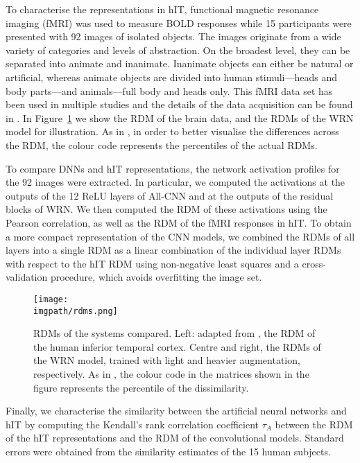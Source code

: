 {To characterise the representations in hIT, functional magnetic resonance imaging (fMRI) was used to measure BOLD responses while 15 participants were presented with 92 images of isolated objects. The images originate from a wide variety of categories and levels of abstraction. On the broadest level, they can be separated into animate and inanimate. Inanimate objects can either be natural or artificial, whereas animate objects are divided into human stimuli---heads and body parts---and animals---full body and heads only. This fMRI data set has been used in multiple studies and the details of the data acquisition can be found in \citep{kriegeskorte2008manandmonkey}. In Figure~\ref{fig:daugit-rdms} we show the RDM of the brain data, and the RDMs of the WRN model for illustration. As in \citep{kriegeskorte2008manandmonkey}, in order to better visualise the differences across the RDM, the colour code represents the percentiles of the actual RDMs.

To compare DNNs and hIT representations, the network activation profiles for the 92 images were extracted. In particular, we computed the activations at the outputs of the 12 ReLU layers of All-CNN and at the outputs of the residual blocks of WRN. We then computed the RDM of these activations using the Pearson correlation, as well as the RDM of the fMRI responses in hIT. To obtain a more compact representation of the CNN models, we combined the RDMs of all layers into a single RDM as a linear combination of the individual layer RDMs with respect to the hIT RDM using non-negative least squares and a cross-validation procedure, which avoids overfitting the image set.

\begin{figure}[ht]
  \begin{center}
    \texttt{[image: \\imgpath/rdms.png]}
  \end{center}
  \caption{RDMs of the systems compared. Left: adapted from \citep{kriegeskorte2008manandmonkey}, the RDM of the human inferior temporal cortex. Centre and right, the RDMs of the WRN model, trained with light and heavier augmentation, respectively. As in \citep{kriegeskorte2008manandmonkey}, the colour code in the matrices shown in the figure represents the percentile of the dissimilarity.}
  \label{fig:daugit-rdms}
\end{figure}

Finally, we characterise the similarity between the artificial neural networks and hIT by computing the Kendall's rank correlation coefficient $\tau_{A}$ between the RDM of the hIT representations and the RDM of the convolutional models. Standard errors were obtained from the similarity estimates of the 15 human subjects.

}
